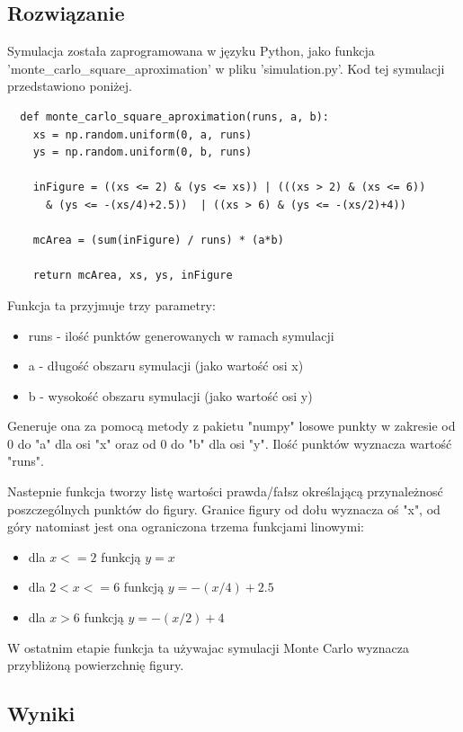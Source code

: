 \documentclass[12pt,oneside,a4paper]{book} %
\theoremstyle{break}
\begin{document}
\subsection*{Rozwiązanie}

Symulacja została zaprogramowana w języku Python, jako funkcja\\ 'monte\_carlo\_square\_aproximation' w pliku 'simulation.py'.
Kod tej symulacji przedstawiono poniżej.
\begin{verbatim}
  def monte_carlo_square_aproximation(runs, a, b):
    xs = np.random.uniform(0, a, runs)
    ys = np.random.uniform(0, b, runs)

    inFigure = ((xs <= 2) & (ys <= xs)) | (((xs > 2) & (xs <= 6)) 
      & (ys <= -(xs/4)+2.5))  | ((xs > 6) & (ys <= -(xs/2)+4))

    mcArea = (sum(inFigure) / runs) * (a*b)

    return mcArea, xs, ys, inFigure
\end{verbatim}

Funkcja ta przyjmuje trzy parametry:
\begin{itemize}
  \item runs - ilość punktów generowanych w ramach symulacji
  \item a - długość obszaru symulacji (jako wartość osi x)
  \item b - wysokość obszaru symulacji (jako wartość osi y)
\end{itemize}

Generuje ona za pomocą metody z pakietu "numpy" losowe punkty w zakresie od 0 do "a" dla osi "x" oraz od 0 do "b" dla osi "y". Ilość punktów wyznacza wartość "runs".

Nastepnie funkcja tworzy listę wartości prawda/fałsz określającą przynależnosć poszczególnych punktów do figury. Granice figury od dołu wyznacza oś "x", od góry natomiast jest ona ograniczona trzema funkcjami linowymi:

\begin{itemize}
  \item dla $x <= 2$ funkcją $y = x$
  \item dla $2 < x <= 6$ funkcją $y = -(x/4) + 2.5 $
  \item dla $x > 6$ funkcją $y = -(x/2) + 4$
\end{itemize}

W ostatnim etapie funkcja ta używajac symulacji Monte Carlo wyznacza przybliżoną powierzchnię figury.

\subsection*{Wyniki}
\end{document}
